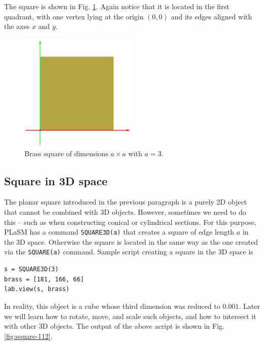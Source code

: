 \noindent
The square is shown in Fig. \ref{fig:square-111}. Again notice that 
it is located in the first quadrant, with one vertex lying at 
the origin $(0, 0)$ and its edges aligned with the axes $x$ and $y$.

\begin{figure}[!ht]
\begin{center}
\includegraphics[width=0.5\textwidth]{img/square-111.png}
\end{center}
\vspace{-4mm}
\caption{Brass square of dimensions $a \times a$ with $a = 3$.}
\label{fig:square-111}
\vspace{-1cm}
\end{figure}
\newpage
\subsection{Square in 3D space}

The planar square introduced in the previous paragraph is a purely 
2D object that cannot be combined with 3D objects. However, sometimes
we need to do this -- such as when constructing conical or cylindrical 
sections. For this purpose, PLaSM has a command {\tt SQUARE3D(a)} that 
creates a square of edge length $a$ in the 3D space. Otherwise the 
square is located in the same way as the one created via the 
{\tt SQUARE(a)} command. Sample script creating a square in the 3D space 
is \\

\begin{bbox}
\begin{verbatim}
s = SQUARE3D(3)
brass = [181, 166, 66]
lab.view(s, brass)
\end{verbatim}
\end{bbox}
\vspace{6mm}

\noindent
In reality, this object is a cube whose third dimension was reduced
to $0.001$. Later we will learn how to rotate, move, and scale such 
objects, and how to intersect it with other 3D objects. The output 
of the above acript is shown in Fig. \ref{fig:square-112}.

